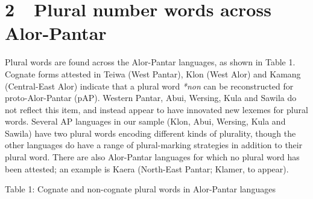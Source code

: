 \section[2\ \ Plural number words across Alor{}-Pantar ]{2\ \ Plural number words across Alor-Pantar }
Plural words are found across the Alor-Pantar languages, as shown in Table 1. Cognate forms attested in Teiwa (West Pantar), Klon (West Alor) and Kamang (Central-East Alor) indicate that a plural word \textit{*non} can be reconstructed for proto-Alor-Pantar (pAP). Western Pantar, Abui, Wersing, Kula and Sawila do not reflect this item, and instead appear to have innovated new lexemes for plural words. Several AP languages in our sample (Klon, Abui, Wersing, Kula and Sawila) have two plural words encoding different kinds of plurality, though the other languages do have a range of plural-marking strategies in addition to their plural word. There are also Alor-Pantar languages for which no plural word has been attested; an example is Kaera (North-East Pantar; Klamer, to appear). 

{\centering
Table 1: Cognate and non-cognate plural words in Alor-Pantar languages
\par}

